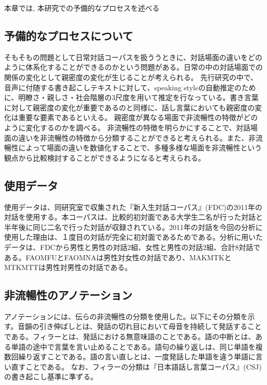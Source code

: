 本章では, 本研究での予備的なプロセスを述べる






\subsection{予備的なプロセスについて}
 そもそもの問題として日常対話コーパスを扱ううときに、対話場面の違いをどのように体系化することができるのかという問題がある。日常の中の対話場面での関係の変化として親密度の変化が生じることが考えられる。
 先行研究の中で、音声に付随する書き起こしテキストに対して、speaking styleの自動推定のために、明瞭さ・親しさ・社会階層の3尺度を用いて推定を行なっている\cite{shen}。書き言葉に対して親密度の変化が重要であるのと同様に、話し言葉においても親密度の変化は重要な要素であるといえる。
親密度が異なる場面で非流暢性の特徴がどのように変化するのかを調べる。
非流暢性の特徴を明らかにすることで、対話場面の違いを非流暢性の特徴から分類することができると考えられる。また、非流暢性によって場面の違いを数値化することで、多種多様な場面を非流暢性という観点から比較検討することができるようになると考えられる。

\subsection{使用データ}\label{data}
 使用データは、同研究室で収集された『新入生対話コーパス』(FDC)\cite{FDC}の2011年の対話を使用する。本コーパスは、比較的初対面である大学生二名が行った対話と半年後に同じ二名で行った対話が収録されている。2011年の対話を今回の分析に使用した理由は、１度目の対話が完全に初対面であるためである。分析に用いたデータは、FDCから男性と男性の対話2組、女性と男性の対話2組、合計8対話である。FAOMFUとFAOMNAは男性対女性の対話であり、MAKMTKとMTKMTTは男性対男性の対話である。

\subsection{非流暢性のアノテーション}
アノテーションには、伝らの非流暢性の分類を使用した。以下にその分類を示す。音韻の引き伸ばしとは、発話の切れ目において母音を持続して発話することである。フィラーとは、発話における無意味語のことである。語の中断とは、ある単語の途中で言葉を言い止めることである。語句の繰り返しは、同じ単語を複数回繰り返すことである。語の言い直しとは、一度発話した単語を違う単語に言い直すことである\cite{den}。
なお、フィラーの分類は『日本語話し言葉コーパス』(CSJ)の書き起こし基準に準ずる\cite{hanashi}。

